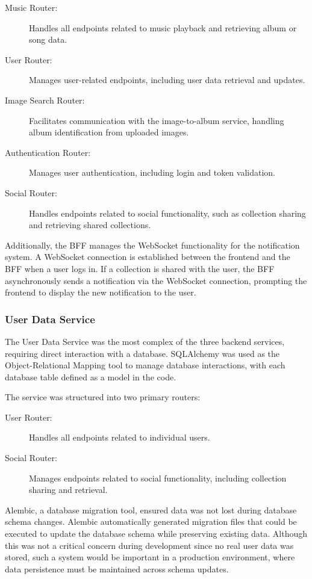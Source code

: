 \begin{description}
    \item[Music Router:] Handles all endpoints related to music playback and retrieving album or song data.
    \item[User Router:] Manages user-related endpoints, including user data retrieval and updates.
    \item[Image Search Router:] Facilitates communication with the image-to-album service, handling album identification from uploaded images.
    \item[Authentication Router:] Manages user authentication, including login and token validation.
    \item[Social Router:] Handles endpoints related to social functionality, such as collection sharing and retrieving shared collections.
\end{description}

Additionally, the BFF manages the WebSocket functionality for the notification system. A WebSocket connection is established between the frontend and the BFF when a user logs in. If a collection is shared with the user, the BFF asynchronously sends a notification via the WebSocket connection, prompting the frontend to display the new notification to the user.

\subsubsection{User Data Service}
The User Data Service was the most complex of the three backend services, requiring direct interaction with a database. SQLAlchemy was used as the Object-Relational Mapping tool to manage database interactions, with each database table defined as a model in the code.

The service was structured into two primary routers:

\begin{description}
    \item[User Router:] Handles all endpoints related to individual users.
    \item[Social Router:] Manages endpoints related to social functionality, including collection sharing and retrieval.
\end{description}

Alembic, a database migration tool, ensured data was not lost during database schema changes. Alembic automatically generated migration files that could be executed to update the database schema while preserving existing data. Although this was not a critical concern during development since no real user data was stored, such a system would be important in a production environment, where data persistence must be maintained across schema updates.


